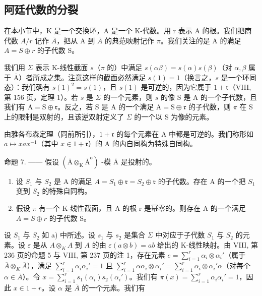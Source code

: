 \subsection{阿廷代数的分裂}

在本小节中，K 是一个交换环，A 是一个 K-代数。用 r 表示 A 的根。我们把商代数 \(A/r\) 记作 \(\overline{A}\)，把从 A 到 \(\overline{A}\) 的典范映射记作 \(\pi\)。我们关注的是 A 的满足 \(A = S \oplus r\) 的子代数 S。

我们用 \(\Sigma\) 表示 K-线性截面 \(s\)（\(\pi\) 的）中满足 \(s(\alpha\beta) = s(\alpha)s(\beta)\)（对 \(\alpha, \beta\) 属于 \(\overline{\mathrm{A}}\)）者所成之集。注意这样的截面必然满足 \(s(1) = 1\)（换言之，\(s\) 是一个环同态）：我们确有 \(s(1)^2 = s(1)\)，且 \(s(1)\) 是可逆的，因为它属于 \(1 + \mathfrak{r}\)（VIII, 第 156 页，定理 1）。若 \(s\) 是 \(\Sigma\) 的一个元素，则 \(s\) 的像 S 是 A 的一个子代数，且我们有 \(\mathrm{A} = \mathrm{S} \oplus \mathfrak{r}\)。反之，若 S 是 A 的一个满足 \(\mathrm{A} = \mathrm{S} \oplus \mathfrak{r}\) 的子代数，则 \(\pi\) 在 S 上的限制是双射的，且该逆双射定义了 \(\Sigma\) 的一个以 S 为像的元素。

由雅各布森定理（同前所引），\(1 + \mathfrak{r}\) 的每个元素在 A 中都是可逆的。我们称形如 \(a \mapsto xax^{-1}\)（其中 \(x \in 1 + \mathfrak{r}\)）的 A 的内自同构为特殊自同构。

命题 7. —— 假设 \((\overline{\mathrm{A}}\otimes_{\mathrm{K}}\overline{\mathrm{A}}^{\mathrm{o}})\) -模 \(\overline{\mathrm{A}}\) 是投射的。

\begin{enumerate}
\def\labelenumi{\alph{enumi})}
\item
  设 \(S_1\) 与 \(S_2\) 是 A 的满足 \(A = S_1 \oplus \mathfrak{r} = S_2 \oplus \mathfrak{r}\) 的子代数。存在 A 的一个把 \(S_1\) 变到 \(S_2\) 的特殊自同构。
\item
  假设 \(\pi\) 有一个 K-线性截面，且 A 的根 r 是幂零的。则存在 A 的一个满足 \(A = S \oplus r\) 的子代数 S。
\end{enumerate}

设 \(S_{1}\) 与 \(S_{2}\) 如 a) 中所述。设 \(s_{1}\) 与 \(s_{2}\) 是集合 \(\Sigma\) 中对应于子代数 \(S_{1}\) 与 \(S_{2}\) 的元素。设 \(\varepsilon\) 是从 \(A \otimes_{K} A\) 到 \(A\) 的由 \(\varepsilon(a \otimes b) = ab\) 给出的 K-线性映射。由 VIII, 第 236 页的命题 5 与 VIII, 第 237 页的注 1，存在元素 \(e = \sum_{i=1}^{r} \alpha_{i} \otimes \alpha_{i}'\)（属于 \(\overline{A} \otimes_{K} \overline{A}\)），满足 \(\sum_{i=1}^{r} \alpha_{i} \alpha_{i}' = 1\) 且 \(\sum_{i=1}^{r} \alpha \alpha_{i} \otimes \alpha_{i}' = \sum_{i=1}^{r} \alpha_{i} \otimes \alpha_{i}' \alpha\)（对每个 \(\alpha \in \overline{A}\)）。令 \(x = \sum_{i=1}^{r} s_{1}(\alpha_{i}) s_{2}(\alpha_{i}')\)。我们有 \(\pi(x) = \sum_{i=1}^{r} \alpha_{i} \alpha_{i}' = 1\)，因此 \(x \in 1 + r\)。设 \(\alpha\) 是 \(\overline{A}\) 的一个元素。我们有

